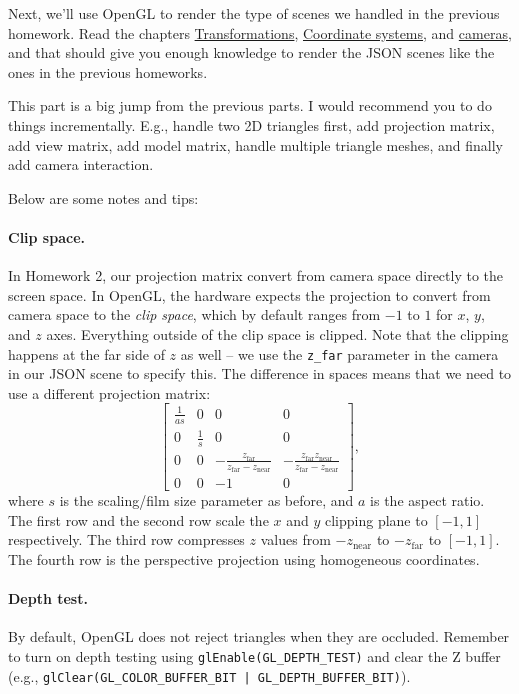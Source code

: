 Next, we'll use OpenGL to render the type of scenes we handled in the previous homework. Read the chapters \href{https://learnopengl.com/Getting-started/Transformations}{Transformations}, \href{https://learnopengl.com/Getting-started/Coordinate-Systems}{Coordinate systems}, and \href{https://learnopengl.com/Getting-started/Camera}{cameras}, and that should give you enough knowledge to render the JSON scenes like the ones in the previous homeworks. 

This part is a big jump from the previous parts. I would recommend you to do things incrementally. E.g., handle two 2D triangles first, add projection matrix, add view matrix, add model matrix, handle multiple triangle meshes, and finally add camera interaction.

Below are some notes and tips:

\paragraph{Clip space.} In Homework 2, our projection matrix convert from camera space directly to the screen space. In OpenGL, the hardware expects the projection to convert from camera space to the \emph{clip space}, which by default ranges from $-1$ to $1$ for $x$, $y$, and $z$ axes. Everything outside of the clip space is clipped. Note that the clipping happens at the far side of $z$ as well -- we use the \lstinline{z_far} parameter in the camera in our JSON scene to specify this. The difference in spaces means that we need to use a different projection matrix:
\begin{equation}
\begin{bmatrix}
\frac{1}{as} & 0 & 0 & 0 \\
0 & \frac{1}{s} & 0 & 0 \\
0 & 0 & -\frac{z_{\text{far}}}{z_{\text{far}} - z_{\text{near}}} & -\frac{z_{\text{far}} z_{\text{near}}}{z_{\text{far}} - z_{\text{near}}} \\
0 & 0 & -1 & 0
\end{bmatrix},
\end{equation} 
where $s$ is the scaling/film size parameter as before, and $a$ is the aspect ratio. The first row and the second row scale the $x$ and $y$ clipping plane to $[-1, 1]$ respectively. The third row compresses $z$ values from $-z_{\text{near}}$ to $-z_{\text{far}}$ to $[-1, 1]$. The fourth row is the perspective projection using homogeneous coordinates.

\paragraph{Depth test.} By default, OpenGL does not reject triangles when they are occluded. Remember to turn on depth testing using \lstinline{glEnable(GL_DEPTH_TEST)} and clear the Z buffer (e.g., \lstinline{glClear(GL_COLOR_BUFFER_BIT | GL_DEPTH_BUFFER_BIT)}).

